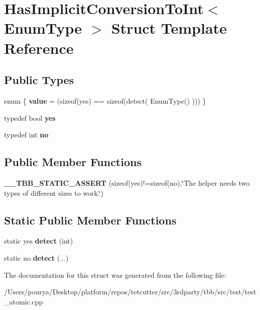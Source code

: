 \hypertarget{structHasImplicitConversionToInt}{}\section{Has\+Implicit\+Conversion\+To\+Int$<$ Enum\+Type $>$ Struct Template Reference}
\label{structHasImplicitConversionToInt}
\subsection*{Public Types}
\begin{DoxyCompactItemize}
\item 
\hypertarget{structHasImplicitConversionToInt_a55fa02a274b4949243abb7be92080f40}{}enum \{ {\bfseries value} = (sizeof(yes) == sizeof(detect( Enum\+Type() )))
 \}\label{structHasImplicitConversionToInt_a55fa02a274b4949243abb7be92080f40}

\item 
\hypertarget{structHasImplicitConversionToInt_af774f02762d161942165c000db12780c}{}typedef bool {\bfseries yes}\label{structHasImplicitConversionToInt_af774f02762d161942165c000db12780c}

\item 
\hypertarget{structHasImplicitConversionToInt_a5928b9b1a17fa7b4352bae736222461c}{}typedef int {\bfseries no}\label{structHasImplicitConversionToInt_a5928b9b1a17fa7b4352bae736222461c}

\end{DoxyCompactItemize}
\subsection*{Public Member Functions}
\begin{DoxyCompactItemize}
\item 
\hypertarget{structHasImplicitConversionToInt_a7924dd180a2af645f9da3262c2968163}{}{\bfseries \+\_\+\+\_\+\+T\+B\+B\+\_\+\+S\+T\+A\+T\+I\+C\+\_\+\+A\+S\+S\+E\+R\+T} (sizeof(yes)!=sizeof(no),\char`\"{}The helper needs two types of different sizes to work.\char`\"{})\label{structHasImplicitConversionToInt_a7924dd180a2af645f9da3262c2968163}

\end{DoxyCompactItemize}
\subsection*{Static Public Member Functions}
\begin{DoxyCompactItemize}
\item 
\hypertarget{structHasImplicitConversionToInt_a384f51ad4df0e96e334f1889e5651c3f}{}static yes {\bfseries detect} (int)\label{structHasImplicitConversionToInt_a384f51ad4df0e96e334f1889e5651c3f}

\item 
\hypertarget{structHasImplicitConversionToInt_a1e6a58fd0b4f66752fd4eb0a9010a15a}{}static no {\bfseries detect} (...)\label{structHasImplicitConversionToInt_a1e6a58fd0b4f66752fd4eb0a9010a15a}

\end{DoxyCompactItemize}


The documentation for this struct was generated from the following file\+:\begin{DoxyCompactItemize}
\item 
/\+Users/pourya/\+Desktop/platform/repos/tetcutter/src/3rdparty/tbb/src/test/test\+\_\+atomic.\+cpp\end{DoxyCompactItemize}
